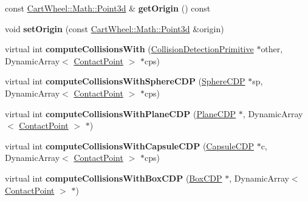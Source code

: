 \begin{DoxyCompactItemize}
\item 
\hypertarget{classCartWheel_1_1Physics_1_1PlaneCDP_aa3c7f7c9a7f57ff0d455f61e0966b411}{
const \hyperlink{classCartWheel_1_1Math_1_1Point3d}{CartWheel::Math::Point3d} \& {\bfseries getOrigin} () const }
\label{classCartWheel_1_1Physics_1_1PlaneCDP_aa3c7f7c9a7f57ff0d455f61e0966b411}

\item 
\hypertarget{classCartWheel_1_1Physics_1_1PlaneCDP_a4498c69f4c0c865d25c03a95e0d318ba}{
void {\bfseries setOrigin} (const \hyperlink{classCartWheel_1_1Math_1_1Point3d}{CartWheel::Math::Point3d} \&origin)}
\label{classCartWheel_1_1Physics_1_1PlaneCDP_a4498c69f4c0c865d25c03a95e0d318ba}

\item 
\hypertarget{classCartWheel_1_1Physics_1_1PlaneCDP_a328ea97c25f56c0a45a471989534430e}{
virtual int {\bfseries computeCollisionsWith} (\hyperlink{classCartWheel_1_1Physics_1_1CollisionDetectionPrimitive}{CollisionDetectionPrimitive} $\ast$other, DynamicArray$<$ \hyperlink{classCartWheel_1_1Physics_1_1ContactPoint}{ContactPoint} $>$ $\ast$cps)}
\label{classCartWheel_1_1Physics_1_1PlaneCDP_a328ea97c25f56c0a45a471989534430e}

\item 
\hypertarget{classCartWheel_1_1Physics_1_1PlaneCDP_ae26168e5d6e4a79e853c8f96b4c74018}{
virtual int {\bfseries computeCollisionsWithSphereCDP} (\hyperlink{classCartWheel_1_1Physics_1_1SphereCDP}{SphereCDP} $\ast$sp, DynamicArray$<$ \hyperlink{classCartWheel_1_1Physics_1_1ContactPoint}{ContactPoint} $>$ $\ast$cps)}
\label{classCartWheel_1_1Physics_1_1PlaneCDP_ae26168e5d6e4a79e853c8f96b4c74018}

\item 
\hypertarget{classCartWheel_1_1Physics_1_1PlaneCDP_a0b30258263cea6493432fcc80644bba0}{
virtual int {\bfseries computeCollisionsWithPlaneCDP} (\hyperlink{classCartWheel_1_1Physics_1_1PlaneCDP}{PlaneCDP} $\ast$, DynamicArray$<$ \hyperlink{classCartWheel_1_1Physics_1_1ContactPoint}{ContactPoint} $>$ $\ast$)}
\label{classCartWheel_1_1Physics_1_1PlaneCDP_a0b30258263cea6493432fcc80644bba0}

\item 
\hypertarget{classCartWheel_1_1Physics_1_1PlaneCDP_a9c4a5549a01b319e8fe8aff0be55e55f}{
virtual int {\bfseries computeCollisionsWithCapsuleCDP} (\hyperlink{classCartWheel_1_1Physics_1_1CapsuleCDP}{CapsuleCDP} $\ast$c, DynamicArray$<$ \hyperlink{classCartWheel_1_1Physics_1_1ContactPoint}{ContactPoint} $>$ $\ast$cps)}
\label{classCartWheel_1_1Physics_1_1PlaneCDP_a9c4a5549a01b319e8fe8aff0be55e55f}

\item 
\hypertarget{classCartWheel_1_1Physics_1_1PlaneCDP_a2f889de6779cf7bb1e0457421de05d0d}{
virtual int {\bfseries computeCollisionsWithBoxCDP} (\hyperlink{classCartWheel_1_1Physics_1_1BoxCDP}{BoxCDP} $\ast$, DynamicArray$<$ \hyperlink{classCartWheel_1_1Physics_1_1ContactPoint}{ContactPoint} $>$ $\ast$)}
\label{classCartWheel_1_1Physics_1_1PlaneCDP_a2f889de6779cf7bb1e0457421de05d0d}

\end{DoxyCompactItemize}

